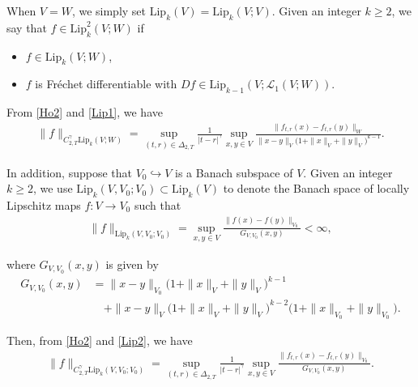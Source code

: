 \documentclass[letterpaper, 11pt,  reqno]{amsart}
\newcommand{\1}{\hspace{0.5mm}\text{I}\hspace{0.5mm}}
\newcommand{\noi}{\noindent}
\newcommand{\Dl}{\Delta}
\newcommand{\g}{\gamma}
\newcommand{\N}{\mathbb{N}}
\newcommand{\cL}{\mathcal{L}}
\newcommand{\Lip}{\mathrm{Lip}}
\numberwithin{equation}{section}
\numberwithin{theorem}{section}
\begin{document}
\noi
When $V = W$, 
we simply set $\Lip_k(V)= \Lip_k(V;V)$.
Given an integer $k \ge 2$, 
we say that $f\in\Lip^2_k(V; W)$ 
if 
\smallskip

\begin{itemize}
\item[(i)] $f\in\Lip_k(V; W)$, 


\smallskip
\item[(ii)]
 $f$ is Fr\'echet differentiable 
with 
$Df \in \Lip_{k-1}(V;\cL_1(V; W))$.


\end{itemize}





\smallskip

\noi
From \eqref{Ho2} and \eqref{Lip1}, we have 
\begin{align}
\|f \|_{C^\g_{2, T}\Lip_k(V;W)}
= \sup_{(t,r) \in \Dl_{2,T}}
\frac 1{|t-r|^{\g}}
\sup_{x,y\in V} 
\frac{\| f_{t, r}(x)- f_{t, r}(y)\|_W}{\|x-y\|_V \big(1+\|x\|_V+\|y\|_V\big)^{k-1}}.
\label{Ho3}
\end{align}


\noi
In addition, suppose that $V_0 \hookrightarrow V$
is a Banach subspace of $V$.
Given an integer $k \ge 2$, %
we  use $\Lip_k(V, V_0; V_0)\subset  \Lip_k(V)$ 
to denote the Banach space of 
locally Lipschitz maps $f:V\to V_0$
such that 
\begin{align}
\|f\|_{\Lip_k(V, V_0; V_0)}
= 
\sup_{x,y\in V} 
\frac{\|f(x)-f(y)\|_{V_0}}
{G_{V, V_0}(x, y)}
<\infty , 
\label{Lip2}
\end{align}

\noi
where $G_{V, V_0}(x, y)$ is given by 
\begin{align*}
G_{V, V_0}(x, y)
& = \|x-y\|_{V_0} \big(1+\|x\|_{V}+\|y\|_{V}\big)^{k-1}\\
& \quad + \|x-y\|_{V} \big(1+\|x\|_{V}+\|y\|_{V}\big)^{k-2}
 \big(1+\|x\|_{V_0}+\|y\|_{V_0}\big).
\end{align*}

\noi
Then, 
from \eqref{Ho2} and \eqref{Lip2}, we have 
\begin{align}
\|f \|_{C^\g_{2, T}\Lip_k(V, V_0; V_0)}
= \sup_{(t,r) \in \Dl_{2,T}}
\frac 1{|t-r|^{\g}}
\sup_{x,y\in V} 
\frac{\| f_{t, r}(x)- f_{t, r}(y)\|_{V_0}}{
G_{V, V_0}(x, y)}.
\label{Ho4}
\end{align}








\medskip
\end{document}
